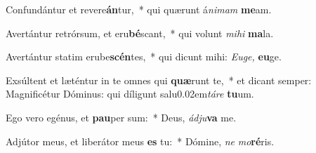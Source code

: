 \item Confundántur et revere\textbf{án}tur,~* qui quærunt á\textit{nimam} \textbf{me}am.
\item Avertántur retrórsum, et eru\textbf{bé}scant,~* qui volunt \textit{mihi} \textbf{ma}la.
\item Avertántur statim erube\textbf{scén}tes,~* qui dicunt mihi: \textit{Euge,} \textbf{eu}ge.
\item Exsúltent et læténtur in te omnes qui \textbf{quæ}runt te,~* et dicant semper: Magnificétur Dóminus: qui díligunt salu\kern 0.02em\textit{táre} \textbf{tu}um.
\item Ego vero egénus, et \textbf{pau}per sum:~* Deus, \textit{ádju}\textbf{va} me.
\item Adjútor meus, et liberátor meus \textbf{es} tu:~* Dómine, \textit{ne} \textit{mo}\textbf{ré}ris.
